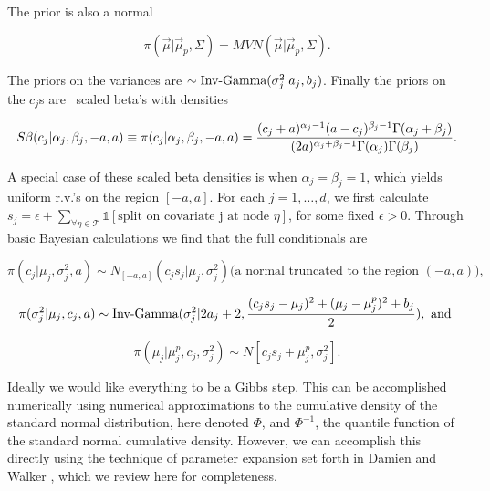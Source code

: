  The prior is also a normal 
 
 \begin{equation}
 \pi(\vec{\mu}\vert \vec{\mu}_p, \Sigma)=MVN(\vec{\mu}\vert \vec{\mu}_p, \Sigma).
 \end{equation}

The priors on the variances are \iid $\sim \text{Inv-Gamma}({\sigma_j^2}\vert{a_j},{b_j})$.
Finally the priors on the $c_j$s are \iid\ scaled beta's with densities 

\begin{equation}\newnot{symbol:scaled_beta}
S\beta(c_j\vert \alpha_j, \beta_j, -a, a)\equiv\pi(c_j\vert \alpha_j, \beta_j, -a, a)= \frac{(c_j+a)^{\alpha_j-1}(a-c_j)^{\beta_j-1}\Gamma(\alpha_j+\beta_j)}{(2a)^{\alpha_j+\beta_j-1}\Gamma(\alpha_j)\Gamma(\beta_j)}.
\end{equation}

A special case of these scaled beta densities is when $\alpha_j=\beta_j=1$, which yields uniform r.v.'s on the region  $[-a,a]$. 
For each $j=1, \dots, d$, we first calculate $s_j = \epsilon+\sum_{\forall \eta \in \mathcal{T}}\mathds{1}[\text{split on covariate j at node $\eta$}]$, for some fixed $\epsilon>0$.
Through basic Bayesian calculations we find that the full conditionals are 

\begin{equation}
\pi(c_j\vert \mu_j, \sigma_j^2, a) \sim N_{[-a,a]}(c_js_j\vert \mu_j, \sigma^2_j) \text{(a normal truncated to the region $(-a,a)$),}
\end{equation}

\begin{equation}
\pi(\sigma^2_j \vert \mu_j, c_j, a) \sim \text{Inv-Gamma}({\sigma_j^2}\vert{2a_j+2},{\frac{(c_js_j-\mu_j)^2+ (\mu_j-\mu_j^p)^2+b_j}{2}}), \text{ and } 
\end{equation}

\begin{equation}
\pi(\mu_j\vert \mu_j^p, c_j, \sigma^2_j)\sim N[c_js_j+\mu_j^p, \sigma_j^2].
\end{equation}

Ideally we would like everything to be a Gibbs step. This can be accomplished numerically using numerical approximations to the cumulative density of the standard normal distribution, here denoted $\Phi$, and $\Phi^{-1}$, the quantile function of the standard normal cumulative density.  However, we can accomplish this directly using the technique of parameter expansion set forth in Damien and Walker \cite{damien2001sampling}, which we review here for completeness. 
 

